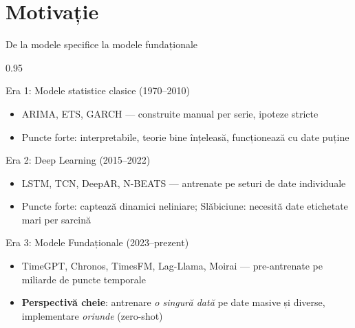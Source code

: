 \documentclass[9pt, aspectratio=169, t]{beamer}
\begin{document}
\section{Motivație}

\begin{frame}{De la modele specifice la modele fundaționale}
    \begin{cminipage}{0.95\textwidth}
    \vspace{-2mm}
    \begin{block}{Era 1: Modele statistice clasice (1970--2010)}
        \begin{itemize}\setlength{\itemsep}{0pt}
            \item ARIMA, ETS, GARCH --- construite manual per serie, ipoteze stricte
            \item Puncte forte: interpretabile, teorie bine înțeleasă, funcționează cu date puține
        \end{itemize}
    \end{block}
    \vspace{-2mm}
    \begin{alertblock}{Era 2: Deep Learning (2015--2022)}
        \begin{itemize}\setlength{\itemsep}{0pt}
            \item LSTM, TCN, DeepAR, N-BEATS --- antrenate pe seturi de date individuale
            \item Puncte forte: captează dinamici neliniare; Slăbiciune: necesită date etichetate mari per sarcină
        \end{itemize}
    \end{alertblock}
    \vspace{-2mm}
    \begin{exampleblock}{Era 3: Modele Fundaționale (2023--prezent)}
        \begin{itemize}\setlength{\itemsep}{0pt}
            \item TimeGPT, Chronos, TimesFM, Lag-Llama, Moirai --- pre-antrenate pe miliarde de puncte temporale
            \item \textbf{Perspectivă cheie}: antrenare \textit{o singură dată} pe date masive și diverse, implementare \textit{oriunde} (zero-shot)
        \end{itemize}
    \end{exampleblock}
    \end{cminipage}
\end{frame}
\end{document}
